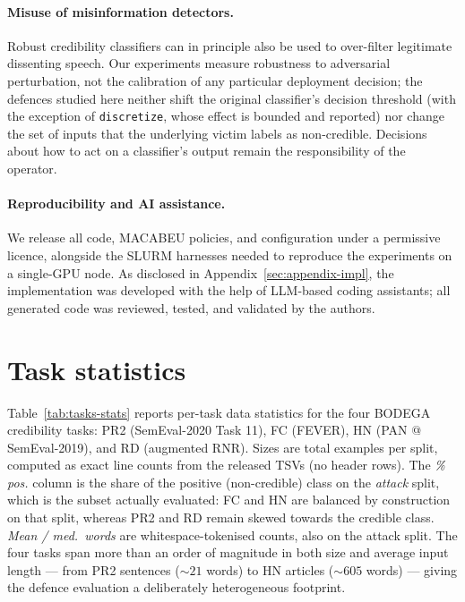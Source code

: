 \documentclass[11pt]{article}
\begin{document}

\paragraph{Misuse of misinformation detectors.} Robust credibility classifiers can in principle also be used to over-filter legitimate dissenting speech. Our experiments measure robustness to adversarial perturbation, not the calibration of any particular deployment decision; the defences studied here neither shift the original classifier's decision threshold (with the exception of \texttt{discretize}, whose effect is bounded and reported) nor change the set of inputs that the underlying victim labels as non-credible. Decisions about how to act on a classifier's output remain the responsibility of the operator.

\paragraph{Reproducibility and AI assistance.} We release all code, MACABEU policies, and configuration under a permissive licence, alongside the SLURM harnesses needed to reproduce the experiments on a single-GPU node. As disclosed in Appendix~\ref{sec:appendix-impl}, the implementation was developed with the help of LLM-based coding assistants; all generated code was reviewed, tested, and validated by the authors.




\appendix
\section{Task statistics}
\label{sec:appendix-task-stats}

Table~\ref{tab:tasks-stats} reports per-task data statistics for the four BODEGA credibility tasks: PR2 (SemEval-2020 Task 11), FC (FEVER), HN (PAN @ SemEval-2019), and RD (augmented RNR). Sizes are total examples per split, computed as exact line counts from the released TSVs (no header rows). The \emph{\% pos.} column is the share of the positive (non-credible) class on the \emph{attack} split, which is the subset actually evaluated: FC and HN are balanced by construction on that split, whereas PR2 and RD remain skewed towards the credible class. \emph{Mean / med.\ words} are whitespace-tokenised counts, also on the attack split. The four tasks span more than an order of magnitude in both size and average input length --- from PR2 sentences ($\sim 21$ words) to HN articles ($\sim 605$ words) --- giving the defence evaluation a deliberately heterogeneous footprint.
\end{document}
